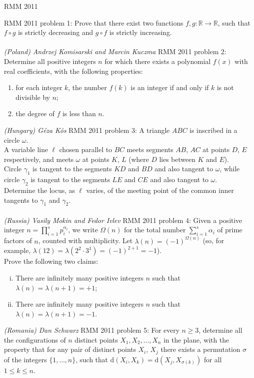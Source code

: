 RMM 2011 

RMM 2011 problem 1:  Prove that there exist two functions $f,g \colon \mathbb{R} \to \mathbb{R}$, such that $f\circ g$ is strictly decreasing and $g\circ f$ is strictly increasing. \\\\
\textit{(Poland) Andrzej Komisarski and Marcin Kuczma} 
RMM 2011 problem 2:  Determine all positive integers $n$ for which there exists a polynomial $f(x)$ with real coefficients, with the following properties:
\begin{enumerate}[(1)]
  \item for each integer $k$, the number $f(k)$ is an integer if and only if $k$ is not divisible by $n$;
  \item the degree of $f$ is less than $n$.
\end{enumerate}
\textit{(Hungary) Géza Kós} 
RMM 2011 problem 3:  A triangle $ABC$ is inscribed in a circle $\omega$. \\
A variable line $\ell$ chosen parallel to $BC$ meets segments $AB$, $AC$ at points $D$, $E$ respectively, and meets $\omega$ at points $K$, $L$ (where $D$ lies between $K$ and $E$). \\
Circle $\gamma_1$ is tangent to the segments $KD$ and $BD$ and also tangent to $\omega$, while circle $\gamma_2$ is tangent to the segments $LE$ and $CE$ and also tangent to $\omega$. \\
Determine the locus, as $\ell$ varies, of the meeting point of the common inner tangents to $\gamma_1$ and $\gamma_2$. \\\\
\textit{(Russia) Vasily Mokin and Fedor Ivlev} 
RMM 2011 problem 4:  Given a positive integer $\displaystyle n = \prod_{i=1}^s p_i^{\alpha_i}$, we write $\Omega(n)$ for the total number $\displaystyle \sum_{i=1}^s \alpha_i$ of prime factors of $n$, counted with multiplicity. Let $\lambda(n) = (-1)^{\Omega(n)}$ (so, for example, $\lambda(12)=\lambda(2^2\cdot3^1)=(-1)^{2+1}=-1$). \\
Prove the following two claims:
\begin{enumerate}[i)]
  \item There are infinitely many positive integers $n$ such that $\lambda(n) = \lambda(n+1) = +1$;
  \item There are infinitely many positive integers $n$ such that $\lambda(n) = \lambda(n+1) = -1$.
\end{enumerate}
\textit{(Romania) Dan Schwarz} 
RMM 2011 problem 5:  For every $n\geq 3$, determine all the configurations of $n$ distinct points $X_1,X_2,\ldots,X_n$ in the plane, with the property that for any pair of distinct points $X_i$, $X_j$ there exists a permutation $\sigma$ of the integers $\{1,\ldots,n\}$, such that $\textrm{d}(X_i,X_k) = \textrm{d}(X_j,X_{\sigma(k)})$ for all $1\leq k \leq n$. \\
